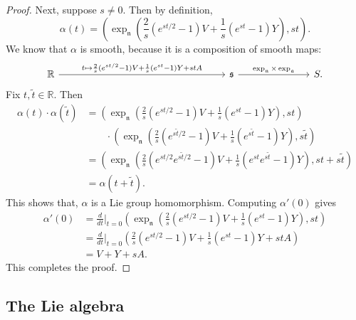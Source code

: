 \documentclass{amsart}
\newcommand{\R}{\mathbb R}
\newcommand{\s}{\mathfrak s}
\newcommand{\n}{\mathfrak n}
\renewcommand{\a}{\mathfrak a}
\theoremstyle{plain}
\theoremstyle{definition}
\theoremstyle{remark}
\begin{document}
\begin{proof}
 		Next, suppose $s \neq 0$. Then by definition, 
 		$$\alpha(t) = \left(\exp_{\n}\left(\frac 2s(e^{st/2}-1)V + \frac1s(e^{st}-1) Y\right),st\right).$$
 		We know that $\alpha$ is smooth, because it is a composition of smooth maps:
 		$$\begin{tikzcd}
 			\R \arrow{rrrrrrr}{t \mapsto \frac 2s(e^{st/2}-1)V + \frac1s(e^{st}-1) Y + stA}  &&&&&&& \s  \arrow{rrr}{\exp_\n \times \exp_\a}&&& S.
 		\end{tikzcd}$$
 		Fix $t, \widetilde t \in \R$. Then 
 		\begin{align*}
 			\alpha(t) \cdot \alpha(\widetilde t) &= \left(\exp_{\n}\left(\frac 2s(e^{st/2}-1)V + \frac1s(e^{st}-1) Y\right),st\right)\\
 			 &\qquad \cdot 
 			\left(\exp_{\n}\left(\frac 2s(e^{s\widetilde t/2}-1)V + \frac1s(e^{s\widetilde t}-1) Y\right),s \widetilde t\right) \\
 			&= \left( \exp_\n\left( \frac2s(e^{st/2}e^{s\widetilde t/2}-1)V + \frac1s(e^{st}e^{s\widetilde t}-1)Y\right), st + s \widetilde t\right) \\
 			&= \alpha(t + \widetilde t).
 		\end{align*}
 		This shows that, $\alpha$ is a Lie group homomorphism. Computing $\alpha'(0)$ gives 
 		\begin{align*}
 			\alpha'(0) &= \frac{d}{dt}\bigg|_{t= 0} \left(\exp_{\n}\left(\frac 2s(e^{st/2}-1)V + \frac1s(e^{st}-1) Y\right),st\right) \\
 			&= \frac{d}{dt}\bigg|_{t= 0}\left(\frac 2s(e^{st/2}-1)V + \frac1s(e^{st}-1) Y + stA\right) \\
 			&= V + Y + sA.
 		\end{align*}
 		This completes the proof.
 	\end{proof}
 
 	\subsection{The Lie algebra}
	 
\end{document}

